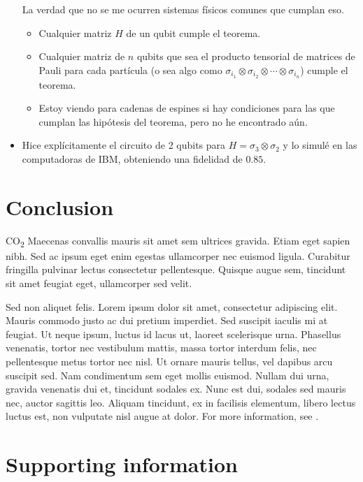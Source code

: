 \documentclass[10pt,letterpaper]{article} %
\begin{document}
\begin{itemize}
La verdad que no se me ocurren sistemas físicos comunes que cumplan eso.
\begin{itemize}
\item Cualquier matriz $H$ de un qubit cumple el teorema.
\item Cualquier matriz de $n$ qubits que sea el producto tensorial de matrices de Pauli para cada partícula (o sea algo como $\sigma_{i_1} \otimes \sigma_{i_2} \otimes \cdots \otimes \sigma_{i_n}$) cumple el teorema.
\item Estoy viendo para cadenas de espines si hay condiciones para las que cumplan las hipótesis del teorema, pero no he encontrado aún.
\end{itemize}
\item Hice explícitamente el circuito de 2 qubits para $H = \sigma_3 \otimes \sigma_2$ y lo simulé en las computadoras de IBM, obteniendo una fidelidad de $0.85$.
\end{itemize}
\section{Conclusion} %

CO\textsubscript{2} Maecenas convallis mauris sit amet sem ultrices gravida. Etiam eget sapien nibh. Sed ac ipsum eget enim egestas ullamcorper nec euismod ligula. Curabitur fringilla pulvinar lectus consectetur pellentesque. Quisque augue sem, tincidunt sit amet feugiat eget, ullamcorper sed velit. 

Sed non aliquet felis. Lorem ipsum dolor sit amet, consectetur adipiscing elit. Mauris commodo justo ac dui pretium imperdiet. Sed suscipit iaculis mi at feugiat. Ut neque ipsum, luctus id lacus ut, laoreet scelerisque urna. Phasellus venenatis, tortor nec vestibulum mattis, massa tortor interdum felis, nec pellentesque metus tortor nec nisl. Ut ornare mauris tellus, vel dapibus arcu suscipit sed. Nam condimentum sem eget mollis euismod. Nullam dui urna, gravida venenatis dui et, tincidunt sodales ex. Nunc est dui, sodales sed mauris nec, auctor sagittis leo. Aliquam tincidunt, ex in facilisis elementum, libero lectus luctus est, non vulputate nisl augue at dolor. For more information, see .
\section{Supporting information} %

\end{document}
